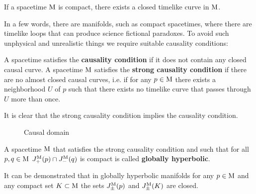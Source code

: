 \begin{prop}
	If a spacetime $\mathrm{M}$ is compact, there exists a closed timelike curve in $\mathrm{M}$.
	\label{prop:paradoxes}
\end{prop}
\noindent In a few words, there are manifolds, such as compact spacetimes, where there are timelike loops that can produce science fictional paradoxes. To avoid such unphysical and unrealistic things we require suitable causality conditions:
\begin{definition}
	A spacetime satisfies the \textbf{causality condition} if it does not contain any closed causal curve. A spacetime $\mathrm{M}$ satisfies the \textbf{strong causality condition} if there are no almost closed causal curves, i.e. if for any $p\in\mathrm{M}$ there exists a neighborhood $U$ of $p$ such that there exists no timelike curve that passes through $U$ more than once.
\end{definition}
\noindent It is clear that the strong causality condition implies the causality condition.
\begin{figure}
	\centering
	\caption{Causal domain}
\end{figure}
\begin{definition}
	A spacetime $\mathrm{M}$ that satisfies the strong causality condition and such that for all $p,q\in\mathrm{M}$ $J_+^{\mathrm{M}}(p)\cap J_-^{\mathrm{M}}(q)$ is compact is called \textbf{globally hyperbolic}.
	\label{defn:globalhyp}
\end{definition}

\noindent It can be demonstrated that in globally hyperbolic manifolds for any $p\in\mathrm{M}$ and any compact set $K\subset\mathrm{M}$ the sets $J_{\pm}^{\mathrm{M}}(p)$ and $J_{\pm}^{\mathrm{M}}(K)$ are closed.


